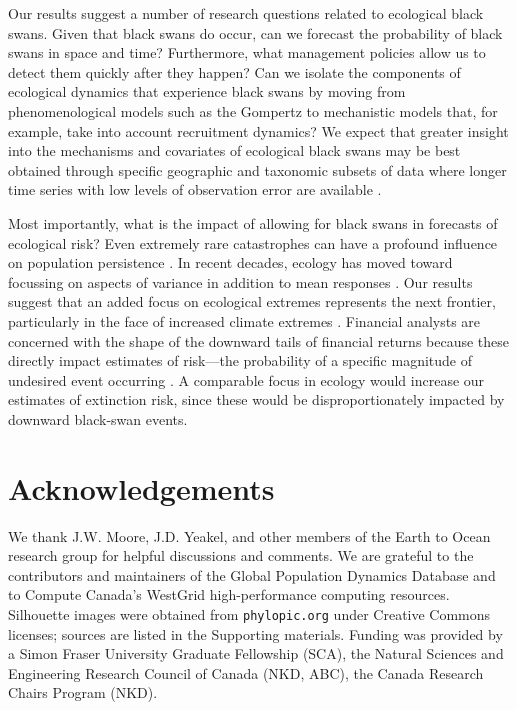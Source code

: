 Our results suggest a number of research questions related to ecological black
swans. Given that black swans do occur, can we forecast the probability of
black swans in space and time? Furthermore, what management policies allow us
to detect them quickly after they happen? Can we isolate the components of
ecological dynamics that experience black swans by moving from
phenomenological models such as the Gompertz to mechanistic models that, for
example, take into account recruitment dynamics? We expect that greater
insight into the mechanisms and covariates of ecological black swans may be
best obtained through specific geographic and taxonomic subsets of data where
longer time series with low levels of observation error are available
\citep[e.g.][]{segura2013}.

Most importantly, what is the impact of allowing for black swans in forecasts
of ecological risk? Even extremely rare catastrophes can have a profound
influence on population persistence \citep{mangel1994}. In recent decades,
ecology has moved toward focussing on aspects of variance in addition to mean
responses \citep[e.g.][]{loreau2010a, thompson2013}. Our results suggest that
an added focus on ecological extremes represents the next frontier,
particularly in the face of increased climate extremes \citep{meehl2004,
  ipcc2012, thompson2013}. Financial analysts are concerned with the shape of
the downward tails of financial returns because these directly impact
estimates of risk---the probability of a specific magnitude of undesired event
occurring \citep{rachev2008}. A comparable focus in ecology would increase our
estimates of extinction risk, since these would be disproportionately impacted
by downward black-swan events.

\section{Acknowledgements}

We thank J.W. Moore, J.D. Yeakel, and other members of the Earth to Ocean
research group for helpful discussions and comments. We are grateful to the
contributors and maintainers of the Global Population Dynamics Database and to
Compute Canada's WestGrid high-performance computing resources. Silhouette
images were obtained from \texttt{phylopic.org} under Creative Commons
licenses; sources are listed in the Supporting materials. Funding was provided
by a Simon Fraser University Graduate Fellowship (SCA), the Natural Sciences
and Engineering Research Council of Canada (NKD, ABC), the Canada Research
Chairs Program (NKD).

